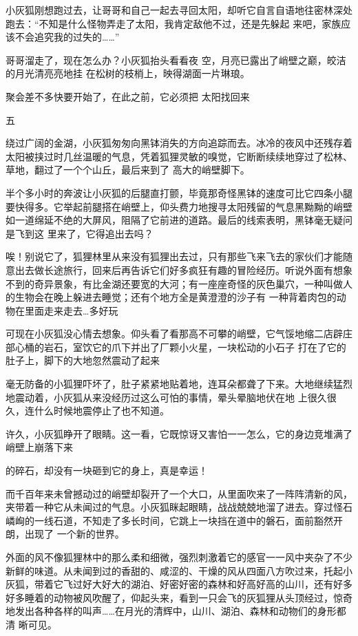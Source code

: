 \documentclass{article}
\begin{document}
小灰狐刚想跑过去，让哥哥和自己一起去寻回太阳，却听它自言自语地往密林深处跑去：“不知是什么怪物弄走了太阳，我肯定敌他不过，还是先躲起
来吧，家族应该不会追究我的过失的……” 

哥哥溜走了，现在怎么办？小灰狐抬头看看夜
\newpage
空，月亮已露出了峭壁之巅，皎洁的月光清亮亮地挂
在松树的枝梢上，映得湖面一片琳琅。 

聚会差不多快要开始了，在此之前，它必须把
太阳找回来 


五 

绕过广阔的金湖，小灰狐匆匆向黑钵消失的方向追踪而去。冰冷的夜风中还残存着太阳被挟过时几丝温暖的气息，凭着狐狸灵敏的嗅觉，它断断续续地穿过了松林、草地，翻过了一个个山丘，最后来到了
高大的峭壁脚下。 

半个多小时的奔波让小灰狐的后腿直打颤，毕竟那奇怪黑钵的速度可比它四条小腿要快得多。它举起前腿搭在峭壁上，仰头费力地搜寻太阳残留的气息黑黝黝的峭壁如一道绵延不绝的大屏风，阻隔了它前进的道路。最后的线索表明，黑钵毫无疑问是飞到这
里来了，它得追出去吗？ 

\newpage

唉！别说它了，狐狸林里从来没有狐狸出去过，只有那些飞来飞去的家伙们才能随意出去做长途旅行，回来后再告诉它们好多疯狂有趣的冒险经历。听说外面有想象不到的奇异景象，有比金湖还要宽的大河；有一座座奇怪的灰色巢穴，一种叫做人的生物会在晚上躲进去睡觉；还有个地方全是黄澄澄的沙子有
一种背着肉包的动物在里面走来走去…多好玩 

可现在小灰狐没心情去想象。仰头看了看那高不可攀的峭壁，它气馁地缩二店辟庄部心桶的岩石，室饮它的爪下并出了厂颗小火星，一块松动的小石子
打在了它的肚子上，脚下的大地忽然震动了起来 

毫无防备的小狐狸吓坏了，肚子紧紧地贴着地，连耳朵都聋了下来。大地继续猛烈地震动着，小灰狐从来没经历过这么可怕的事情，晕头晕脑地伏在地
上很久很久，连什么时候地震停止了也不知道。 

许久，小灰狐睁开了眼睛。这一看，它既惊讶又害怕一一怎么，它的身边竞堆满了峭壁上崩落下来

\newpage
的碎石，却没有一块砸到它的身上，真是幸运！ 

而千百年来未曾撼动过的峭壁却裂开了一个大口，从里面吹来了一阵阵清新的风，夹带着一种它从未闻过的气息。小灰狐眯起眼睛，战战兢兢地溜了进去。穿过怪石嶙峋的一线石道，不知走了多长时间，它跳上一块挡在道中的磐石，面前豁然开朗，出现了
一个新的世界。 

外面的风不像狐狸林中的那么柔和细微，强烈刺激着它的感官一一风中夹杂了不少新鲜的味道。从未闻到过的香甜的、咸涩的、干燥的风从四面八方吹过来，托起小灰狐，带着它飞过好大好大的湖泊、好密好密的森林和好高好高的山川，还有好多好多睡着的动物被风吹醒了，仰起头来，看到一只会飞的灰狐狸从头顶经过，惊奇地发出各种各样的叫声……在月光的清辉中，山川、湖泊、森林和动物们的身形都清
晰可见。 
\end{document}
